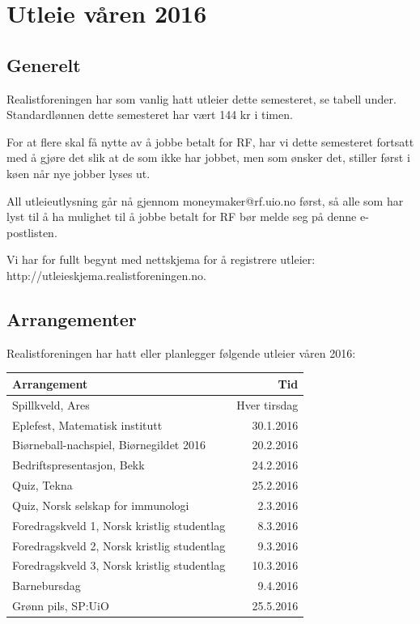 \documentclass[12pt]{article}
\begin{document}
\pagestyle{fancy}
\fancyhf{}

\section*{Utleie våren 2016}
\label{sec:1}
\subsection*{Generelt}
Realistforeningen har som vanlig hatt utleier dette semesteret, se tabell under.
Standardlønnen dette semesteret har vært 144 kr i timen. 

For at flere skal få nytte av å jobbe betalt for RF,
har vi dette semesteret fortsatt med å gjøre det slik at de som ikke har jobbet,
men som ønsker det, stiller først i køen når nye jobber lyses ut.

All utleieutlysning går nå gjennom moneymaker@rf.uio.no først,
så alle som har lyst til å ha mulighet til å jobbe betalt for RF bør
melde seg på denne e-postlisten.

Vi har for fullt begynt med nettskjema for å registrere utleier:
http://utleieskjema.realistforeningen.no.

\subsection*{Arrangementer}
Realistforeningen har hatt eller planlegger følgende utleier våren 2016:\\

\begin{tabular}{l r}
\bfseries Arrangement & \bfseries Tid\\
\hline
Spillkveld, Ares &	Hver tirsdag\\
Eplefest, Matematisk institutt &	30.1.2016\\
Biørneball-nachspiel, Biørnegildet 2016 &	20.2.2016\\
Bedriftspresentasjon, Bekk &	24.2.2016\\
Quiz, Tekna & 25.2.2016\\
Quiz, Norsk selskap for immunologi &	2.3.2016\\
Foredragskveld 1, Norsk kristlig studentlag &	8.3.2016\\
Foredragskveld 2, Norsk kristlig studentlag &	9.3.2016\\
Foredragskveld 3, Norsk kristlig studentlag &	10.3.2016\\
Barnebursdag &	9.4.2016\\
Grønn pils, SP:UiO &	25.5.2016
\end{tabular}
\end{document}
